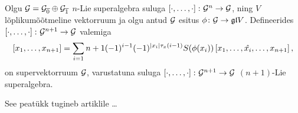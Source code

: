 \begin{thm}
    Olgu $\mathcal{G} = \mathcal{G}_{\overline{0}} \oplus \mathcal{G}_{\overline{1}}$
    $n$-Lie superalgebra suluga $\left[ \cdot, \dots, \cdot \right] \colon \mathcal{G}^n \to \mathcal{G}$,
    ning $V$ lõplikumõõtmeline vektorruum ja olgu
    antud $\mathcal{G}$ esitus $\phi \colon \mathcal{G} \to \mathfrak{gl} V$. Defineerides
    $\left[ \cdot, \dots, \cdot \right] \colon \mathcal{G}^{n+1} \to \mathcal{G}$ valemiga
    \[
        \left[ x_1, \dots, x_{n+1} \right] = \sum_{i=1}{n+1}
        (-1)^{i-1} (-1)^{|x_i| \tau_x (i-1)} S(\phi(x_i))
        \left[ x_1, \dots, \hat{x_i}, \dots, x_{n+1} \right],
    \]
    on supervektorruum $\mathcal{G}$, varustatuna suluga
    $\left[ \cdot, \dots, \cdot \right] \colon \mathcal{G}^{n+1} \to \mathcal{G}$ $(n+1)$-Lie
    superalgebra.
\end{thm}

See peatükk tugineb artiklile \cite{Abramov:2014} \dots
